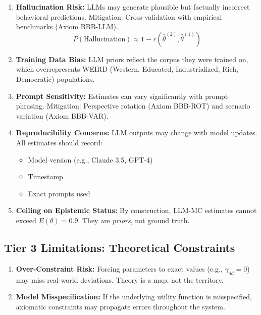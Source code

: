 \documentclass[11pt,a4paper]{article}
\theoremstyle{definition}
\begin{document}
\begin{enumerate}
    \item \textbf{Hallucination Risk:}
    LLMs may generate plausible but factually incorrect behavioral predictions. 
    Mitigation: Cross-validation with empirical benchmarks (Axiom BBB-LLM).
    \begin{equation}
    P(\text{Hallucination}) \approx 1 - r(\hat{\theta}^{(2)}, \hat{\theta}^{(1)})
    \end{equation}
    
    \item \textbf{Training Data Bias:}
    LLM priors reflect the corpus they were trained on, which overrepresents 
    WEIRD (Western, Educated, Industrialized, Rich, Democratic) populations.
    
    \item \textbf{Prompt Sensitivity:}
    Estimates can vary significantly with prompt phrasing. Mitigation: 
    Perspective rotation (Axiom BBB-ROT) and scenario variation (Axiom BBB-VAR).
    
    \item \textbf{Reproducibility Concerns:}
    LLM outputs may change with model updates. All estimates should record:
    \begin{itemize}
        \item Model version (e.g., Claude 3.5, GPT-4)
        \item Timestamp
        \item Exact prompts used
    \end{itemize}
    
    \item \textbf{Ceiling on Epistemic Status:}
    By construction, LLM-MC estimates cannot exceed $E(\theta) = 0.9$. 
    They are \textit{priors}, not ground truth.
\end{enumerate}

\subsection{Tier 3 Limitations: Theoretical Constraints}

\begin{enumerate}
    \item \textbf{Over-Constraint Risk:}
    Forcing parameters to exact values (e.g., $\gamma_{dd} = 0$) may miss 
    real-world deviations. Theory is a map, not the territory.
    
    \item \textbf{Model Misspecification:}
    If the underlying utility function is misspecified, axiomatic constraints 
    may propagate errors throughout the system.
\end{enumerate}
\end{document}
